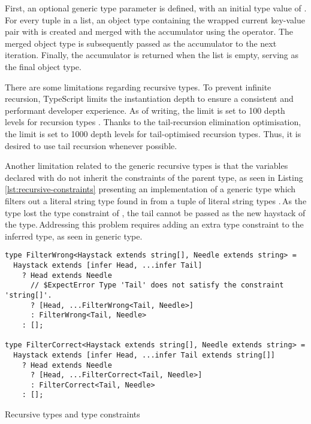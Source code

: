 First, an optional generic type parameter  is defined, with an initial type value of \vcode{{}}. For every tuple in a list, an object type containing the wrapped current key-value pair with  is created and merged with the accumulator using the \vcode{&} operator. The merged object type is subsequently passed as the accumulator to the next iteration. Finally, the accumulator is returned when the list is empty, serving as the final object type.

There are some limitations regarding recursive types. To prevent infinite recursion, TypeScript limits the instantiation depth to ensure a consistent and performant developer experience. As of writing, the limit is set to 100 depth levels for recursion types \cite{ImplementationCheckerTs2023}. Thanks to the tail-recursion elimination optimisation, the limit is set to 1000 depth levels for tail-optimised recursion types. Thus, it is desired to use tail recursion whenever possible.

Another limitation related to the generic recursive types is that the variables declared with  do not inherit the constraints of the parent type, as seen in Listing \ref{lst:recursive-constraints} presenting an implementation of a generic type which filters out a literal string type found in  from a tuple of literal string types .\,As the  type lost the type constraint of , the tail cannot be passed as the new haystack of the  type.\,Addressing this problem requires adding an extra type constraint to the inferred type, as seen in  generic type.

\clearpage

\begin{listing}[ht]
  \begin{verbatim}
type FilterWrong<Haystack extends string[], Needle extends string> =
  Haystack extends [infer Head, ...infer Tail]
    ? Head extends Needle
      // $ExpectError Type 'Tail' does not satisfy the constraint 'string[]'.
      ? [Head, ...FilterWrong<Tail, Needle>]
      : FilterWrong<Tail, Needle>
    : [];

type FilterCorrect<Haystack extends string[], Needle extends string> =
  Haystack extends [infer Head, ...infer Tail extends string[]]
    ? Head extends Needle
      ? [Head, ...FilterCorrect<Tail, Needle>]
      : FilterCorrect<Tail, Needle>
    : [];
\end{verbatim}
  \caption{Recursive types and type constraints}\label{lst:recursive-constraints}
\end{listing}

